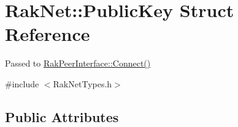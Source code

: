 \hypertarget{struct_rak_net_1_1_public_key}{\section{Rak\-Net\-:\-:Public\-Key Struct Reference}
\label{struct_rak_net_1_1_public_key}
}


Passed to \hyperlink{class_rak_net_1_1_rak_peer_interface_a451dd5d225277fe5806d3d700551fb76}{Rak\-Peer\-Interface\-::\-Connect()}  




{\ttfamily \#include $<$Rak\-Net\-Types.\-h$>$}

\subsection*{Public Attributes}
